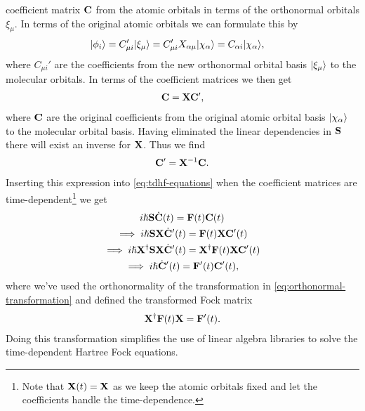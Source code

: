         coefficient matrix $\mathbf{C}$ from the atomic orbitals in terms of the
        orthonormal orbitals $\xi_{\mu}$. In terms of the original atomic
        orbitals we can formulate this by
        \begin{align}
            | \phi_i \rangle
            &= C_{\mu i}'| \xi_{\mu} \rangle
            = C_{\mu i}'X_{\alpha \mu}| \chi_{\alpha} \rangle
            = C_{\alpha i}| \chi_{\alpha} \rangle,
        \end{align}
        where $C_{\mu i}'$ are the coefficients from the new orthonormal orbital
        basis $| \xi_{\mu} \rangle$ to the molecular orbitals. In terms of the
        coefficient matrices we then get
        \begin{align}
            \mathbf{C} = \mathbf{X}\mathbf{C}',
        \end{align}
        where $\mathbf{C}$ are the original coefficients from the original atomic
        orbital basis $| \chi_{\alpha} \rangle$ to the molecular orbital basis.
        Having eliminated the linear dependencies in $\mathbf{S}$ there will exist
        an inverse for $\mathbf{X}$. Thus we find
        \begin{align}
            \mathbf{C}' = \mathbf{X}^{-1}\mathbf{C}.
        \end{align}
        Inserting this expression into \autoref{eq:tdhf-equations} when the
        coefficient matrices are time-dependent\footnote{Note that $\mathbf{X}(t) =
        \mathbf{X}$ as we keep the atomic orbitals fixed and let the coefficients
        handle the time-dependence.} we get
        \begin{gather}
            i\hslash\mathbf{S}\dot{\mathbf{C}}(t) = \mathbf{F}(t)\mathbf{C}(t) \\
            \implies
            i\hslash\mathbf{S}\mathbf{X}\dot{\mathbf{C}}'(t) = \mathbf{F}(t)\mathbf{X}\mathbf{C}'(t)
            \\
            \implies
            i\hslash\mathbf{X}^{\dagger}\mathbf{S}\mathbf{X}\dot{\mathbf{C}}'(t)
            = \mathbf{X}^{\dagger}\mathbf{F}(t)\mathbf{X}\mathbf{C}'(t)
            \\
            \implies
            i\hslash \dot{\mathbf{C}}'(t) = \mathbf{F}'(t)\mathbf{C}'(t),
        \end{gather}
        where we've used the orthonormality of the transformation in
        \autoref{eq:orthonormal-transformation} and defined the transformed Fock
        matrix
        \begin{align}
            \mathbf{X}^{\dagger}\mathbf{F}(t)\mathbf{X} = \mathbf{F}'(t).
        \end{align}
        Doing this transformation simplifies the use of linear algebra libraries
        to solve the time-dependent Hartree Fock equations.

